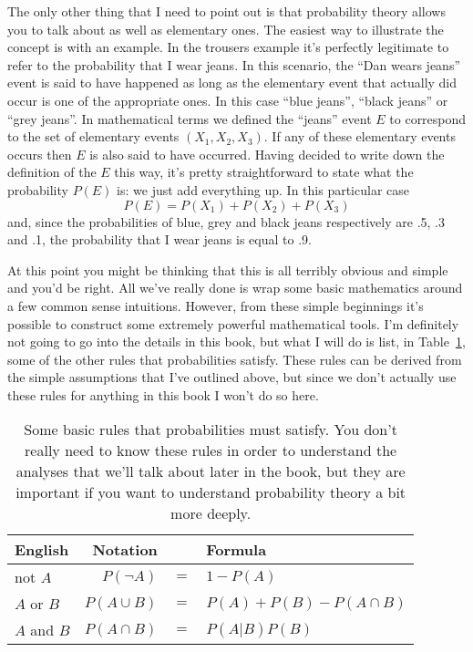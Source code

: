 The only other thing that I need to point out is that probability theory allows you to talk about  as well as elementary ones. The easiest way to illustrate the concept is with an example. In the trousers example it's perfectly legitimate to refer to the probability that I wear jeans. In this scenario, the ``Dan wears jeans'' event is said to have happened as long as the elementary event that actually did occur is one of the appropriate ones. In this case ``blue jeans'', ``black jeans'' or ``grey jeans''. In mathematical terms we defined the ``jeans'' event $E$ to correspond to the set of elementary events $(X_1, X_2, X_3)$. If any of these elementary events occurs then $E$ is also said to have occurred. Having decided to write down the definition of the $E$ this way, it's pretty straightforward to state what the probability $P(E)$ is: we just add everything up. In this particular case
$$
P(E) = P(X_1) + P(X_2) + P(X_3)
$$ 
and, since the probabilities of blue, grey and black jeans respectively are .5, .3 and .1, the probability that I wear jeans is equal to .9. 

At this point you might be thinking that this is all terribly obvious and simple and you'd be right. All we've really done is wrap some basic mathematics around a few common sense intuitions. However, from these simple beginnings it's possible to construct some extremely powerful mathematical tools. I'm definitely not going to go into the details in this book, but what I will do is list, in Table~\ref{tab:probrules}, some of the other rules that probabilities satisfy. These rules can be derived from the simple assumptions that I've outlined above, but since we don't actually use these rules for anything in this book I won't do so here.

\begin{table}
\caption{Some basic rules that probabilities must satisfy. You don't really need to know these rules in order to understand the analyses that we'll talk about later in the book, but they are important if you want to understand probability theory a bit more deeply.}\tabcapsep
\label{tab:probrules}
\begin{center}
\begin{tabular}{lrcl}
English & Notation & & Formula \\ \hline
not $A$ & $P(\neg A)$ &$=$& $1-P(A)$ \\
$A$ or $B$ & $P(A \cup B)$ &$=$& $P(A) + P(B) - P(A \cap B)$ \\
$A$ and $B$ & $P(A \cap B)$ &$=$& $P(A|B) P(B)$ \\
\end{tabular}
\tabcapsep \HR
\end{center}
\end{table}




